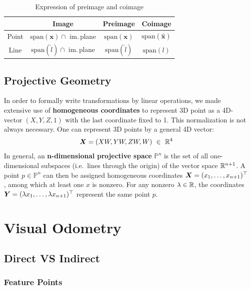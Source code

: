 \begin{table}[h]
\centering
\begin{tabular}{cccc}
	& Image & Preimage & Coimage \\ \midrule
	Point
		& $\text{span}(\bm{x}) \cap$ im.\,plane
		& $\text{span}(\bm{x})$
		& $\text{span}(\bm{\widehat{x}})$ \\
	Line
		& $\text{span}(\widehat{l}) \cap$ im.\,plane
		& $\text{span}(\widehat{l})$
		& $\text{span}(l)$ \\
\end{tabular}
\caption{Expression of preimage and coimage}%
\label{tab:expression_preimage_coimage}
\end{table}



\subsection{Projective Geometry}%
\label{sub:projective_geometry}


In order to formally write transformations by linear operations,
we made extensive use of \textbf{homogeneous coordinates} to represent
3D point as a 4D-vector $(X,Y,Z,1)$ with the last coordinate fixed to 1.
This normalization is not always necessary. One can represent 3D points
by a general 4D vector:
\[
	\bm{X} = (XW, YW, ZW, W)\ \in\ \mathbb{R}^4
\]
In general, an \textbf{n-dimensional projective space} $\mathbb{P}^n$
is the set of all one-dimensional subspaces (i.e.\ lines through the origin)
of the vector space $\mathbb{R}^{n+1}$.
A point $p \in \mathbb{P}^n$ can then be assigned homogeneous coordinates
$\bm{X} = (x_1, \ldots, x_{n+1})^{\top}$, among which at least one $x$ is nonzero.
For any nonzero $\lambda \in \mathbb{R}$, the coordinates
$\bm{Y} = (\lambda x_1, \ldots, \lambda x_{n+1})^{\top}$
represent the same point $p$.


\section{Visual Odometry}%
\label{sec:visual-odometry}

\subsection{Direct VS Indirect}%
\label{sub:direct-indirect}

\subsubsection{Feature Points}%
\label{ssub:feature-points}

